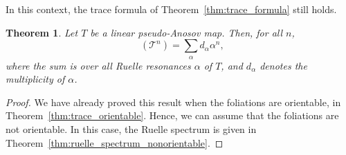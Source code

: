 \documentclass[11pt, a4paper, oneside, final, pagebackref]{amsart}
\newcommand{\boT}{\mathcal{T}}
\DeclareMathOperator{\flattr}{\mathrm{tr}^{\flat}}
\newtheorem{thm}{Theorem}[section]
\theoremstyle{definition}
\numberwithin{equation}{section}
\begin{document}
In this context, the trace formula of Theorem~\ref{thm:trace_formula} still
holds.
\begin{thm}
Let $T$ be a linear pseudo-Anosov map. Then, for all $n$,
\begin{equation}
\label{eq:wsldfjknrt,nwfkjh}
  \flattr(\boT^n) = \sum_\alpha d_\alpha \alpha^n,
\end{equation}
where the sum is over all Ruelle resonances $\alpha$ of $T$, and $d_\alpha$
denotes the multiplicity of $\alpha$.
\end{thm}
\begin{proof}
We have already proved this result when the foliations are orientable, in
Theorem~\ref{thm:trace_orientable}. Hence, we can assume that the foliations
are not orientable. In this case, the Ruelle spectrum is given in
Theorem~\ref{thm:ruelle_spectrum_nonorientable}.


\end{proof}
\end{document}
